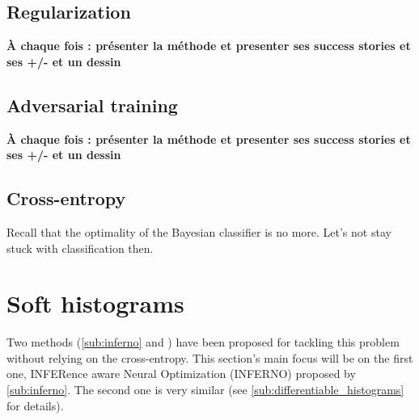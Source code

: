 \subsection{Regularization} %
\label{sub:regularization}



\textbf{À chaque fois : présenter la méthode et presenter ses success stories et ses +/- et un dessin}





\subsection{Adversarial training} %
\label{sub:adversarial_training}



\textbf{À chaque fois : présenter la méthode et presenter ses success stories et ses +/- et un dessin}




\subsection{Cross-entropy} %
\label{sub:cross_entropy}

Recall that the optimality of the Bayesian classifier is no more.
Let's not stay stuck with classification then.









\section{Soft histograms} %
\label{sec:soft_histograms}



Two methods (\autoref{sub:inferno} and \needcite) have been proposed for tackling this problem without relying on the cross-entropy.
This section's main focus will be on the first one, INFERence aware Neural Optimization (INFERNO) proposed by \autoref{sub:inferno}.
The second one is very similar (see \autoref{sub:differentiable_histograms} for details).





